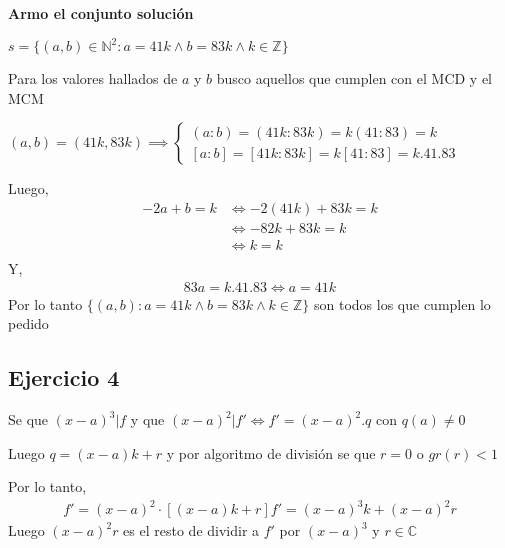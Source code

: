 \textbf{Armo el conjunto solución}

$ s = \{ (a,b) \in \mathbb{N}^2: a = 41k \wedge b = 83k \wedge k \in \mathbb{Z} \} $

Para los valores hallados de $a$ y $b$ busco aquellos que cumplen con el MCD y el MCM 

$ (a,b) = (41k, 83k) \implies \begin{cases}
    (a:b) = (41k:83k) = k(41:83) = k \\
    [a:b] = [41k:83k] = k[41:83] = k.41.83
\end{cases} $

Luego,
\begin{align*}
    -2a + b = k &\iff -2(41k) + 83k = k \\
    &\iff -82k + 83k = k \\
    &\iff k = k \\
\end{align*}
Y,
\begin{align*}
    83a = k.41.83 \iff a = 41k
\end{align*}
Por lo tanto $ \{ (a,b): a = 41k \wedge b = 83k \wedge k \in \mathbb{Z} \} $ son todos los que cumplen lo pedido

\subsection{Ejercicio 4}

Se que $ (x-a)^3 | f $ y que $ (x-a)^2 | f' \iff f'=(x-a)^2.q $ con $ q(a) \neq 0 $

Luego $ q = (x-a)k +r $ y por algoritmo de división se que $ r = 0 $ o $ gr(r) < 1 $

Por lo tanto,
\begin{align*}
    f' = (x-a)^2 \cdot \left[ (x-a)k + r \right]
    f' = (x-a)^3k + (x-a)^2r
\end{align*}
Luego $ (x-a)^2r $ es el resto de dividir a $f'$ por $(x-a)^3 $ y $ r \in \mathbb{C} $


